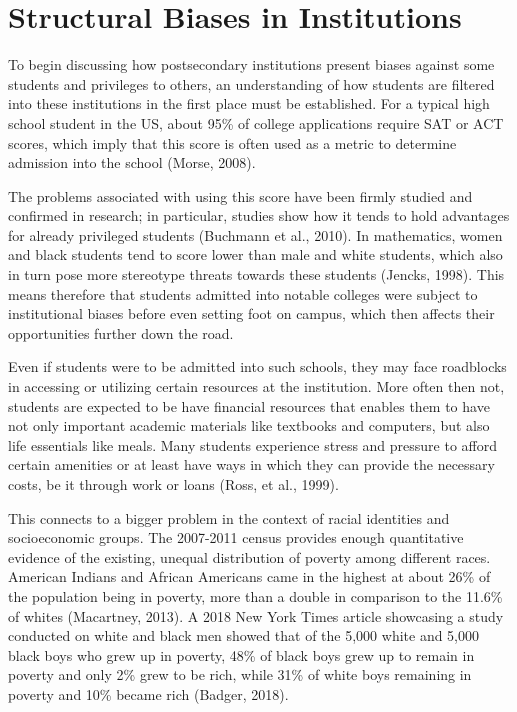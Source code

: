 \section{Structural Biases in Institutions}
To begin discussing how postsecondary institutions present biases against some students and privileges to others, an understanding of how students are filtered into these institutions in the first place must be established. For a typical high school student in the US, about 95\% of college applications require SAT or ACT scores, which imply that this score is often used as a metric to determine admission into the school (Morse, 2008).

The problems associated with using this score have been firmly studied and confirmed in research; in particular, studies show how it tends to hold advantages for already privileged students (Buchmann et al., 2010). In mathematics, women and black students tend to score lower than male and white students, which also in turn pose more stereotype threats towards these students (Jencks, 1998). This means therefore that students admitted into notable colleges were subject to institutional biases before even setting foot on campus, which then affects their opportunities further down the road.

Even if students were to be admitted into such schools, they may face roadblocks in accessing or utilizing certain resources at the institution. More often then not, students are expected to be have financial resources that enables them to have not only important academic materials like textbooks and computers, but also life essentials like meals. Many students experience stress and pressure to afford certain amenities or at least have ways in which they can provide the necessary costs, be it through work or loans (Ross, et al., 1999).

This connects to a bigger problem in the context of racial identities and socioeconomic groups. The 2007-2011 census provides enough quantitative evidence of the existing, unequal distribution of poverty among different races. American Indians and African Americans came in the highest at about 26\% of the population being in poverty, more than a double in comparison to the 11.6\% of whites (Macartney, 2013). A 2018 New York Times article showcasing a study conducted on white and black men showed that of the 5,000 white and 5,000 black boys who grew up in poverty, 48\% of black boys grew up to remain in poverty and only 2\% grew to be rich, while 31\% of white boys remaining in poverty and 10\% became rich (Badger, 2018).

